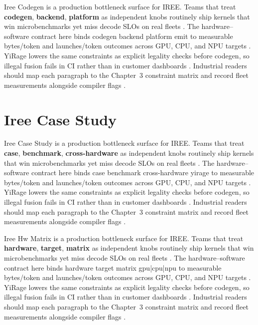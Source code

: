 Iree Codegen is a production bottleneck surface for IREE. Teams that treat \textbf{codegen}, \textbf{backend}, \textbf{platform} as independent knobs routinely ship kernels that win microbenchmarks yet miss decode SLOs on real fleets \citep{nvidia2022hopper,amd2024aie}. The hardware--software contract here binds codegen backend platform emit to measurable bytes/token and launches/token outcomes across GPU, CPU, and NPU targets \citep{semianalysis2024tma,dlbook}. YiRage lowers the same constraints as explicit legality checks before codegen, so illegal fusion fails in CI rather than in customer dashboards \citep{amd2024xdna,dao2022flashattention}. Industrial readers should map each paragraph to the Chapter~3 constraint matrix and record fleet measurements alongside compiler flags \citep{amd2024aie,kwon2023vllm}.

\section{Iree Case Study}
\label{sec:iree_case_study}

Iree Case Study is a production bottleneck surface for IREE. Teams that treat \textbf{case}, \textbf{benchmark}, \textbf{cross-hardware} as independent knobs routinely ship kernels that win microbenchmarks yet miss decode SLOs on real fleets \citep{semianalysis2024tma,dlbook}. The hardware--software contract here binds case benchmark cross-hardware yirage to measurable bytes/token and launches/token outcomes across GPU, CPU, and NPU targets \citep{amd2024xdna,dao2022flashattention}. YiRage lowers the same constraints as explicit legality checks before codegen, so illegal fusion fails in CI rather than in customer dashboards \citep{amd2024aie,kwon2023vllm}. Industrial readers should map each paragraph to the Chapter~3 constraint matrix and record fleet measurements alongside compiler flags \citep{dlbook,nvidia2024cudagraphs}.

Iree Hw Matrix is a production bottleneck surface for IREE. Teams that treat \textbf{hardware}, \textbf{target}, \textbf{matrix} as independent knobs routinely ship kernels that win microbenchmarks yet miss decode SLOs on real fleets \citep{memoryfloor2026,amd2024xdna}. The hardware--software contract here binds hardware target matrix gpu|cpu|npu to measurable bytes/token and launches/token outcomes across GPU, CPU, and NPU targets \citep{nvidia2022hopper,amd2024aie}. YiRage lowers the same constraints as explicit legality checks before codegen, so illegal fusion fails in CI rather than in customer dashboards \citep{semianalysis2024tma,dlbook}. Industrial readers should map each paragraph to the Chapter~3 constraint matrix and record fleet measurements alongside compiler flags \citep{amd2024xdna,dao2022flashattention}.

